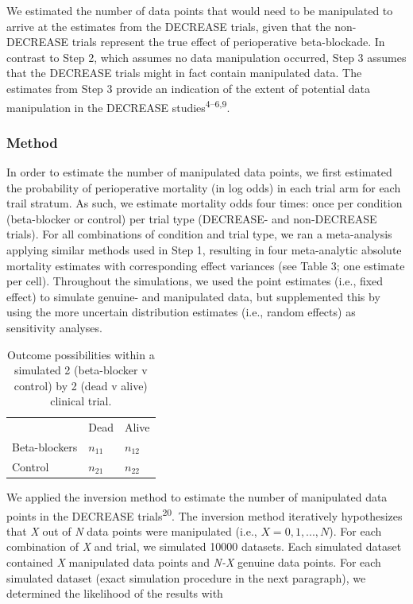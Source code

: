 \documentclass[]{article}
\begin{document}
We estimated the number of data points that would need to be manipulated
to arrive at the estimates from the DECREASE trials, given that the
non-DECREASE trials represent the true effect of perioperative
beta-blockade. In contrast to Step 2, which assumes no data manipulation
occurred, Step 3 assumes that the DECREASE trials might in fact contain
manipulated data. The estimates from Step 3 provide an indication of the
extent of potential data manipulation in the DECREASE
studies\textsuperscript{4--6,9}.

\subsubsection{Method}\label{method-1}

In order to estimate the number of manipulated data points, we first
estimated the probability of perioperative mortality (in log odds) in
each trial arm for each trail stratum. As such, we estimate mortality
odds four times: once per condition (beta-blocker or control) per trial
type (DECREASE- and non-DECREASE trials). For all combinations of
condition and trial type, we ran a meta-analysis applying similar
methods used in Step 1, resulting in four meta-analytic absolute
mortality estimates with corresponding effect variances (see Table 3;
one estimate per cell). Throughout the simulations, we used the point
estimates (i.e., fixed effect) to simulate genuine- and manipulated
data, but supplemented this by using the more uncertain distribution
estimates (i.e., random effects) as sensitivity analyses.

\begin{longtable}[]{@{}lll@{}}
\caption{Outcome possibilities within a simulated 2 (beta-blocker v
control) by 2 (dead v alive) clinical trial.}\tabularnewline
\toprule
& Dead & Alive\tabularnewline
Beta-blockers & \(n_{11}\) & \(n_{12}\)\tabularnewline
Control & \(n_{21}\) & \(n_{22}\)\tabularnewline
\bottomrule
\end{longtable}

We applied the inversion method to estimate the number of manipulated
data points in the DECREASE trials\textsuperscript{20}. The inversion
method iteratively hypothesizes that \emph{X} out of \emph{N} data
points were manipulated (i.e., \(X={0, 1, ..., N}\)). For each
combination of \emph{X} and trial, we simulated 10000 datasets. Each
simulated dataset contained \emph{X} manipulated data points and
\emph{N-X} genuine data points. For each simulated dataset (exact
simulation procedure in the next paragraph), we determined the
likelihood of the results with
\end{document}
